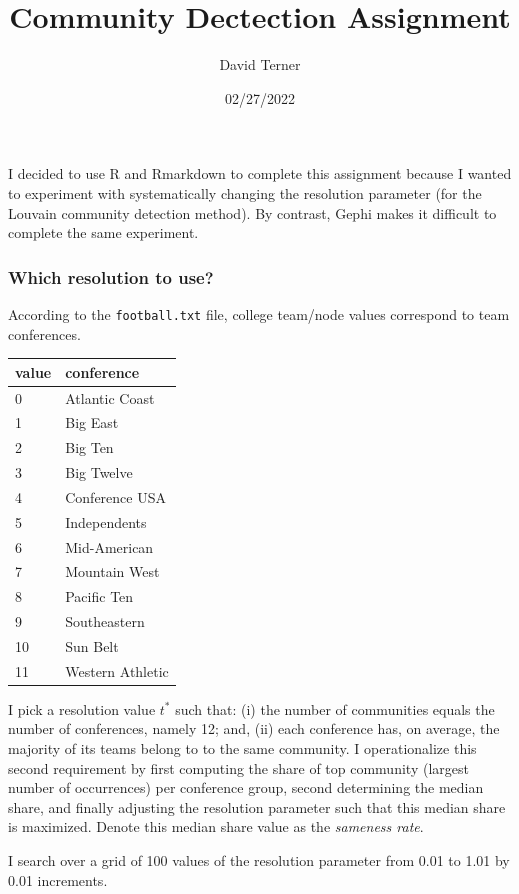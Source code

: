 \documentclass[
]{article}
\title{Community Dectection Assignment}
\author{David Terner}
\date{02/27/2022}
\begin{document}
\maketitle

I decided to use R and Rmarkdown to complete this assignment because I
wanted to experiment with systematically changing the resolution
parameter (for the Louvain community detection method). By contrast,
Gephi makes it difficult to complete the same experiment.

\hypertarget{which-resolution-to-use}{%
\subsubsection{Which resolution to use?}\label{which-resolution-to-use}}

According to the \texttt{football.txt} file, college team/node values
correspond to team conferences.

\begin{tabular}{l|l}
\hline
value & conference\\
\hline
0 & Atlantic Coast\\
\hline
1 & Big East\\
\hline
2 & Big Ten\\
\hline
3 & Big Twelve\\
\hline
4 & Conference USA\\
\hline
5 & Independents\\
\hline
6 & Mid-American\\
\hline
7 & Mountain West\\
\hline
8 & Pacific Ten\\
\hline
9 & Southeastern\\
\hline
10 & Sun Belt\\
\hline
11 & Western Athletic\\
\hline
\end{tabular}

I pick a resolution value \(t^*\) such that: (i) the number of
communities equals the number of conferences, namely 12; and, (ii) each
conference has, on average, the majority of its teams belong to to the
same community. I operationalize this second requirement by first
computing the share of top community (largest number of occurrences) per
conference group, second determining the median share, and finally
adjusting the resolution parameter such that this median share is
maximized. Denote this median share value as the \emph{sameness rate}.

I search over a grid of 100 values of the resolution parameter from 0.01
to 1.01 by 0.01 increments.
\end{document}
